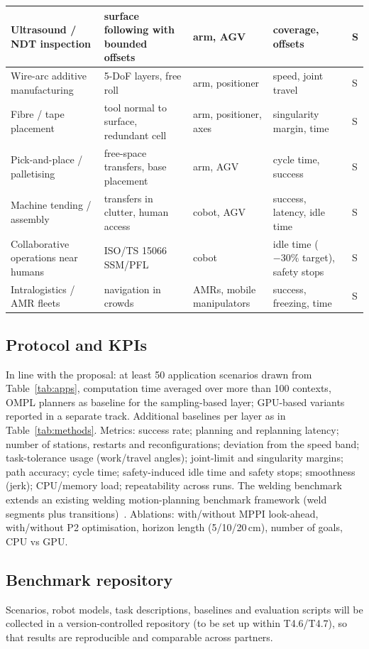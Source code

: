 {\begin{longtable}{|L{2.8cm}|L{4.4cm}|L{2.9cm}|L{2.6cm}|L{1.2cm}|}
Ultrasound / NDT inspection & surface following with bounded offsets~\cite{yin2024dprealtime} & arm, AGV & coverage, offsets & S \\ \hline
Wire-arc additive manufacturing & 5-DoF layers, free roll~\cite{dharmawan2018functional} & arm, positioner & speed, joint travel & S \\ \hline
Fibre / tape placement & tool normal to surface, redundant cell~\cite{farzanehkaloorazi2018pathplacement} & arm, positioner, axes & singularity margin, time & S \\ \hline
Pick-and-place / palletising & free-space transfers, base placement~\cite{wachter2024tcpbase} & arm, AGV & cycle time, success & S \\ \hline
Machine tending / assembly & transfers in clutter, human access & cobot, AGV & success, latency, idle time & S \\ \hline
Collaborative operations near humans & ISO/TS 15066 SSM/PFL~\cite{faroni2022safetyaware,gursoy2026cosmik} & cobot & idle time ($-30\%$ target), safety stops & S \\ \hline
Intralogistics / AMR fleets & navigation in crowds~\cite{trevisan2025drampi,macenski2023nav2survey} & AMRs, mobile manipulators & success, freezing, time & S \\ \hline
\end{longtable}}

\subsection{Protocol and KPIs}
In line with the proposal: at least 50 application scenarios drawn from Table~\ref{tab:apps}, computation time averaged over more than 100 contexts, OMPL planners as baseline for the sampling-based layer; GPU-based variants reported in a separate track. Additional baselines per layer as in Table~\ref{tab:methods}. Metrics: success rate; planning and replanning latency; number of stations, restarts and reconfigurations; deviation from the speed band; task-tolerance usage (work/travel angles); joint-limit and singularity margins; path accuracy; cycle time; safety-induced idle time and safety stops; smoothness (jerk); CPU/memory load; repeatability across runs. The welding benchmark extends an existing welding motion-planning benchmark framework (weld segments plus transitions)~\cite{demaeyer2021weldbenchmark}. Ablations: with/without MPPI look-ahead, with/without P2 optimisation, horizon length (5/10/20\,cm), number of goals, CPU vs GPU.

\subsection{Benchmark repository}
Scenarios, robot models, task descriptions, baselines and evaluation scripts will be collected in a version-controlled repository (to be set up within T4.6/T4.7), so that results are reproducible and comparable across partners.
